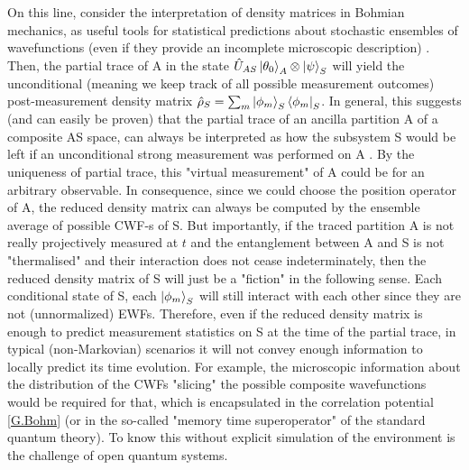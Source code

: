\documentclass[11pt, a4paper]{article} %
\begin{document}
On this line, consider the interpretation of density matrices in Bohmian mechanics, as useful tools for statistical predictions about stochastic ensembles of wavefunctions (even if they provide an incomplete microscopic description) \cite{density, operatorsObservables}. Then, the partial trace of A in the state $\hat{U}_{AS}\ket{\theta_0}_A\otimes\ket{\psi}_S$ will yield the unconditional (meaning we keep track of all possible measurement outcomes) post-measurement density matrix $\hat{\rho}_S=\sum_m \ket{\phi_m}_S\bra{\phi_m}_S$. In general, this suggests (and can easily be proven) that the partial trace of an ancilla partition A of a composite AS space, can always be interpreted as how the subsystem S would be left if an unconditional strong measurement was performed on A \cite{Generalized}. By the uniqueness of partial trace, this "virtual measurement" of A could be for an arbitrary observable. In consequence, since we could choose the position operator of A, the reduced density matrix can always be computed by the ensemble average of possible CWF-s of S. But importantly, if the traced partition A is not really projectively measured at $t$ and the entanglement between A and S is not "thermalised" and their interaction does not cease indeterminately, then the reduced density matrix of S will just be a "fiction" in the following sense. Each conditional state of S, each $\ket{\phi_m}_S$ will still interact with each other since they are not (unnormalized) EWFs. Therefore, even if the reduced density matrix is enough to predict measurement statistics on S at the time of the partial trace, in typical (non-Markovian) scenarios it will not convey enough information to locally predict its time evolution. For example, the microscopic information about the distribution of the CWFs "slicing" the possible composite wavefunctions would be required for that, which is encapsulated in the correlation potential \eqref{G.Bohm} (or in the so-called "memory time superoperator" \cite{WisemanSSE} of the standard quantum theory). To know this without explicit simulation of the environment is the challenge of open quantum systems.\vspace{-0.25cm}


\end{document}
